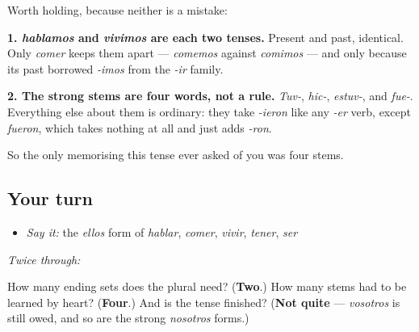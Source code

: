 \begin{grammarlens}[title={Grammar Lens: the two quiet overlaps}]
Worth holding, because neither is a mistake:

\textbf{1. \emph{hablamos} and \emph{vivimos} are each two tenses.} Present and past, identical. Only \emph{comer} keeps them apart — \emph{comemos} against \emph{comimos} — and only because its past borrowed \emph{-imos} from the \emph{-ir} family.

\textbf{2. The strong stems are four words, not a rule.} \emph{Tuv-}, \emph{hic-}, \emph{estuv-}, and \emph{fue-}. Everything else about them is ordinary: they take \emph{-ieron} like any \emph{-er} verb, except \emph{fueron}, which takes nothing at all and just adds \emph{-ron}.

So the only memorising this tense ever asked of you was four stems.
\end{grammarlens}

\subsection*{Your turn}
\begin{itemize}
\raggedright
  \item \emph{Say it:} the \emph{ellos} form of \emph{hablar}, \emph{comer}, \emph{vivir}, \emph{tener}, \emph{ser}
\end{itemize}

\emph{Twice through:}

\begin{tcolorbox}[breakable,colback=teal!4,colframe=teal!35!black,title={Before you move on}]
How many ending sets does the plural need? (\textbf{Two}.) How many stems had to be learned by heart? (\textbf{Four}.) And is the tense finished? (\textbf{Not quite} — \emph{vosotros} is still owed, and so are the strong \emph{nosotros} forms.)
\end{tcolorbox}
